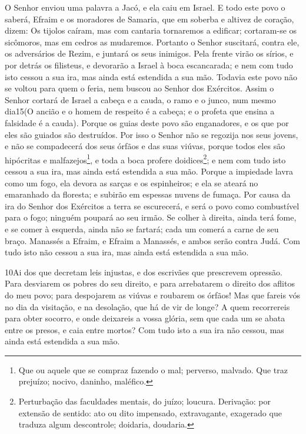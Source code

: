 O Senhor enviou uma palavra a Jacó, e ela caiu em Israel. E
todo este povo o saberá, Efraim e os moradores de Samaria, que em
soberba e altivez de coração, dizem: Os tijolos caíram, mas
com cantaria tornaremos a edificar; cortaram-se os sicômoros, mas em
cedros as mudaremos. Portanto o Senhor suscitará, contra ele,
os adversários de Rezim, e juntará os seus inimigos. Pela
frente virão os sírios, e por detrás os filisteus, e devorarão a
Israel à boca escancarada; e nem com tudo isto cessou a sua ira, mas
ainda está estendida a sua mão. Todavia este povo não se
voltou para quem o feria, nem buscou ao Senhor dos Exércitos.
Assim o Senhor cortará de Israel a cabeça e a cauda, o ramo e
o junco, num mesmo dia15(O ancião e o homem de respeito é a cabeça;
e o profeta que ensina a falsidade é a cauda). Porque os
guias deste povo são enganadores, e os que por eles são guiados são
destruídos. Por isso o Senhor não se regozija nos seus
jovens, e não se compadecerá dos seus órfãos e das suas viúvas,
porque todos eles são hipócritas e malfazejos\footnote{Que ou aquele
que se compraz fazendo o mal; perverso, malvado. Que traz prejuízo;
nocivo, daninho, maléfico.}, e toda a boca profere
doidices\footnote{Perturbação das faculdades mentais, do juízo;
loucura. Derivação: por extensão de sentido: ato ou dito impensado,
extravagante, exagerado que traduza algum descontrole; doidaria,
doudaria.}; e nem com tudo isto cessou a sua ira, mas ainda está
estendida a sua mão. Porque a impiedade lavra como um fogo,
ela devora as sarças e os espinheiros; e ela se ateará no emaranhado
da floresta; e subirão em espessas nuvens de fumaça. Por
causa da ira do Senhor dos Exércitos a terra se escurecerá, e será o
povo como combustível para o fogo; ninguém poupará ao seu irmão.
Se colher à direita, ainda terá fome, e se comer à esquerda,
ainda não se fartará; cada um comerá a carne de seu braço.
Manassés a Efraim, e Efraim a Manassés, e ambos serão contra
Judá. Com tudo isto não cessou a sua ira, mas ainda está estendida a
sua mão.

\medskip

\lettrine{10}{}Ai dos que decretam leis injustas, e dos
escrivães que prescrevem opressão. Para desviarem os pobres do
seu direito, e para arrebatarem o direito dos aflitos do meu povo;
para despojarem as viúvas e roubarem os órfãos! Mas que fareis
vós no dia da visitação, e na desolação, que há de vir de longe? A
quem recorrereis para obter socorro, e onde deixareis a vossa
glória, sem que cada um se abata entre os presos, e caia entre
mortos? Com tudo isto a sua ira não cessou, mas ainda está estendida
a sua mão.


